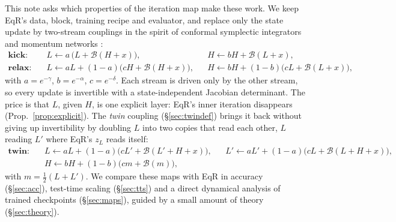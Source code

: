 \documentclass[11pt]{article}
\theoremstyle{definition}
\newcommand{\zL}{z_L}
\newcommand{\Bk}{\mathcal{B}}
\begin{document}
This note asks which properties of the iteration map make these work. We keep EqR's data, block, training recipe
and evaluator, and replace only the state update by two-stream couplings in the spirit of conformal symplectic
integrators \cite{mclachlan2001conformal,franca2020conformal} and momentum networks \cite{sander2021momentum}:
\begin{align*}
\textbf{kick:}&\quad L \leftarrow a\,\bigl(L + \Bk(H+x)\bigr), && H \leftarrow bH + \Bk(L+x),\\
\textbf{relax:}&\quad L \leftarrow aL + (1-a)\bigl(cH + \Bk(H+x)\bigr), && H \leftarrow bH + (1-b)\bigl(cL + \Bk(L+x)\bigr),
\end{align*}
with $a=e^{-\gamma}$, $b=e^{-\alpha}$, $c=e^{-\delta}$. Each stream is driven only by the other stream, so every
update is invertible with a state-independent Jacobian determinant. The price is that $L$, given $H$, is one explicit
layer: EqR's inner iteration disappears (Prop.~\ref{prop:explicit}). The \emph{twin} coupling (\S\ref{sec:twindef}) brings it back
without giving up invertibility by doubling $L$ into two copies that read each other, $L$ reading $L'$ where EqR's $\zL$ reads itself:
\begin{align*}
\textbf{twin:}&\quad L \leftarrow aL + (1-a)\bigl(cL' + \Bk(L'+H+x)\bigr), && L' \leftarrow aL' + (1-a)\bigl(cL + \Bk(L+H+x)\bigr),\\
&\quad H \leftarrow bH + (1-b)\bigl(cm + \Bk(m)\bigr), &&
\end{align*}
with $m=\frac12(L+L')$. We compare these maps with EqR in
accuracy (\S\ref{sec:acc}), test-time scaling (\S\ref{sec:tts}) and a direct dynamical analysis of trained
checkpoints (\S\ref{sec:maps}), guided by a small amount of theory (\S\ref{sec:theory}).
\end{document}
